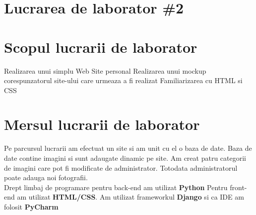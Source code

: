 \section*{Lucrarea de laborator \#2}

\section{Scopul lucrarii de laborator}
Realizarea unui simplu Web Site personal
Realizarea unui mockup corespunzatorul site-ului care urmeaza a fi realizat
Familiarizarea cu HTML si CSS

\section{Mersul lucrarii de laborator}
\tab Pe parcursul lucrarii am efectuat un site si am unit cu el o baza de date.
Baza de date contine imagini si sunt adaugate dinamic pe site. Am creat patru
categorii de imagini care pot fi modificate de administrator. Totodata
administratorul poate adauga noi fotografii.\\
\tab Drept limbaj de programare pentru back-end am utilizat \textbf{Python}
Pentru front-end am utilizat \textbf{HTML/CSS}. Am utilizat frameworkul
\textbf{Django} si ca IDE am folosit \textbf{PyCharm}

